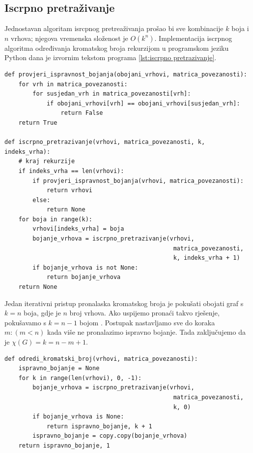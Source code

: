 \documentclass[times, utf8, zavrsni, numeric]{fer}
\begin{document}
\subsection{Iscrpno pretraživanje}
Jednostavan algoritam isrcpnog pretreaživanja prošao bi sve kombinacije $k$ boja i $n$ vrhova; njegova vremenska složenost je $O(k^n)$. Implementacija iscrpnog algoritma određivanja kromatskog broja rekurzijom u programskom jeziku Python dana je izvornim tekstom programa \ref{lst:iscrpno pretrazivanje}.

\begin{lstlisting}[caption=Iscrpno pretraživanje, label={lst:iscrpno pretrazivanje}]
def provjeri_ispravnost_bojanja(obojani_vrhovi, matrica_povezanosti):
    for vrh in matrica_povezanosti:
        for susjedan_vrh in matrica_povezanosti[vrh]:
            if obojani_vrhovi[vrh] == obojani_vrhovi[susjedan_vrh]:
                return False
    return True

def iscrpno_pretrazivanje(vrhovi, matrica_povezanosti, k, indeks_vrha):
    # kraj rekurzije
    if indeks_vrha == len(vrhovi):
        if provjeri_ispravnost_bojanja(vrhovi, matrica_povezanosti):
            return vrhovi
        else:
            return None
    for boja in range(k):
        vrhovi[indeks_vrha] = boja
        bojanje_vrhova = iscrpno_pretrazivanje(vrhovi, 
                                                matrica_povezanosti, 
                                                k, indeks_vrha + 1)
        if bojanje_vrhova is not None:
            return bojanje_vrhova
    return None
\end{lstlisting}


Jedan iterativni pristup pronalaska kromatskog broja je pokušati obojati graf s $k=n$ boja, gdje je $n$ broj vrhova. Ako uspijemo pronaći takvo rješenje, pokušavamo s $k=n-1$ bojom \cite{geeksforgeeks}. Postupak nastavljamo sve do koraka $m: (m < n)$ kada više ne pronalazimo ispravno bojanje. Tada zaključujemo da je $\chi(G)=k=n-m+1$.

\begin{lstlisting}[caption=Određivanje kromatskog broja, label={lst:odredivanje kromatskog broja}]
def odredi_kromatski_broj(vrhovi, matrica_povezanosti):
    ispravno_bojanje = None
    for k in range(len(vrhovi), 0, -1):
        bojanje_vrhova = iscrpno_pretrazivanje(vrhovi, 
                                                matrica_povezanosti, 
                                                k, 0)
        if bojanje_vrhova is None:
            return ispravno_bojanje, k + 1
        ispravno_bojanje = copy.copy(bojanje_vrhova)
    return ispravno_bojanje, 1
\end{lstlisting}
\end{document}
